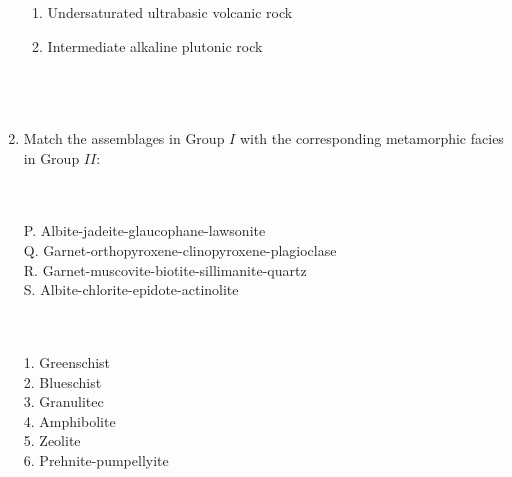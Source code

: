 \documentclass[12pt,fleqn]{article}
\theoremstyle{remark}
\begin{document}
\begin{enumerate}[label=Q.\arabic*.]
\begin{enumerate}
                \item Undersaturated ultrabasic volcanic rock
                \item Intermediate alkaline plutonic rock\\\\\\\\
            \end{enumerate}
\item Match the assemblages in Group $I$ with the corresponding metamorphic facies in Group $II$: \hfill{} \\
    
\begin{multicols}{2}
            \\\\
            P. Albite-jadeite-glaucophane-lawsonite\\
            Q. Garnet-orthopyroxene-clinopyroxene-plagioclase\\
            R. Garnet-muscovite-biotite-sillimanite-quartz\\
            S. Albite-chlorite-epidote-actinolite

            \columnbreak
            
            \\\\
            1. Greenschist\\
            2. Blueschist\\
            3. Granulitec\\
            4. Amphibolite\\
            5. Zeolite\\
            6. Prehnite-pumpellyite


        \end{multicols}
            \begin {enumerate}
\end{enumerate}
\end{enumerate}
\end{document}
